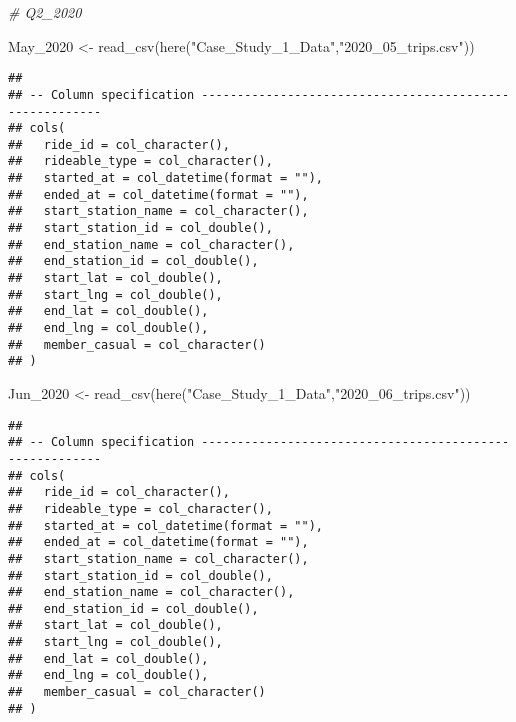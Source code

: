 \documentclass[
]{article}
\newenvironment{Shaded}{\begin{snugshade}}{\end{snugshade}}
\newcommand{\CommentTok}[1]{\textcolor[rgb]{0.56,0.35,0.01}{\textit{#1}}}
\newcommand{\FunctionTok}[1]{\textcolor[rgb]{0.00,0.00,0.00}{#1}}
\newcommand{\NormalTok}[1]{#1}
\newcommand{\OtherTok}[1]{\textcolor[rgb]{0.56,0.35,0.01}{#1}}
\newcommand{\StringTok}[1]{\textcolor[rgb]{0.31,0.60,0.02}{#1}}
\begin{document}
\begin{Shaded}
\begin{Highlighting}[]
\CommentTok{\# Q2\_2020 }
\end{Highlighting}
\end{Shaded}

\begin{Shaded}
\begin{Highlighting}[]
\NormalTok{ May\_2020 }\OtherTok{\textless{}{-}} \FunctionTok{read\_csv}\NormalTok{(}\FunctionTok{here}\NormalTok{(}\StringTok{"Case\_Study\_1\_Data"}\NormalTok{,}\StringTok{"2020\_05\_trips.csv"}\NormalTok{))}
\end{Highlighting}
\end{Shaded}

\begin{verbatim}
## 
## -- Column specification --------------------------------------------------------
## cols(
##   ride_id = col_character(),
##   rideable_type = col_character(),
##   started_at = col_datetime(format = ""),
##   ended_at = col_datetime(format = ""),
##   start_station_name = col_character(),
##   start_station_id = col_double(),
##   end_station_name = col_character(),
##   end_station_id = col_double(),
##   start_lat = col_double(),
##   start_lng = col_double(),
##   end_lat = col_double(),
##   end_lng = col_double(),
##   member_casual = col_character()
## )
\end{verbatim}

\begin{Shaded}
\begin{Highlighting}[]
\NormalTok{ Jun\_2020 }\OtherTok{\textless{}{-}} \FunctionTok{read\_csv}\NormalTok{(}\FunctionTok{here}\NormalTok{(}\StringTok{"Case\_Study\_1\_Data"}\NormalTok{,}\StringTok{"2020\_06\_trips.csv"}\NormalTok{))}
\end{Highlighting}
\end{Shaded}

\begin{verbatim}
## 
## -- Column specification --------------------------------------------------------
## cols(
##   ride_id = col_character(),
##   rideable_type = col_character(),
##   started_at = col_datetime(format = ""),
##   ended_at = col_datetime(format = ""),
##   start_station_name = col_character(),
##   start_station_id = col_double(),
##   end_station_name = col_character(),
##   end_station_id = col_double(),
##   start_lat = col_double(),
##   start_lng = col_double(),
##   end_lat = col_double(),
##   end_lng = col_double(),
##   member_casual = col_character()
## )
\end{verbatim}
\end{document}
